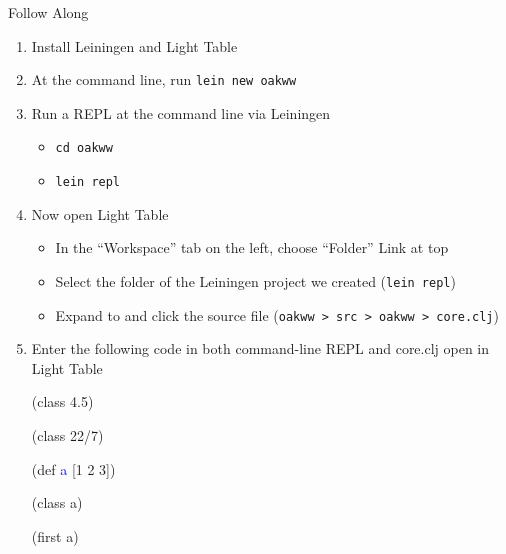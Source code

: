 \documentclass{beamer}
\begin{document}
\begin{frame}[allowframebreaks]{Follow Along}
  \begin{enumerate}
  \item Install Leiningen and Light Table
  \item At the command line, run \texttt{lein new oakww}
  \item Run a REPL at the command line via Leiningen
    \begin{itemize}
    \item \texttt{cd oakww}
    \item \texttt{lein repl}
    \end{itemize}
  \item Now open Light Table
    \begin{itemize}
    \item In the ``Workspace'' tab on the left, choose ``Folder'' Link
      at top
    \item Select the folder of the Leiningen project we created
      (\texttt{lein repl})
    \item Expand to and click the source file (\texttt{oakww > src > oakww > core.clj})
    \end{itemize}

  \framebreak
  \item Enter the following code in both command-line REPL and
    core.clj open in Light Table\\
\begin{small}
{\ttfamily\color{black}
%
\textcolor[rgb]{0.54901963,0.54901963,0.54901963}{(}\textcolor[rgb]{0.28235295,0.23921569,0.54509807}{class}
4.5\textcolor[rgb]{0.54901963,0.54901963,0.54901963}{)}}

{\ttfamily\color{black}
\textcolor[rgb]{0.54901963,0.54901963,0.54901963}{(}\textcolor[rgb]{0.28235295,0.23921569,0.54509807}{class}
22/7\textcolor[rgb]{0.54901963,0.54901963,0.54901963}{)}}

{\ttfamily\color{black}
\textcolor[rgb]{0.54901963,0.54901963,0.54901963}{(}\textcolor[rgb]{0.49803922,0.0,0.49803922}{def}
\textcolor{blue}{a} [1 2
3]\textcolor[rgb]{0.54901963,0.54901963,0.54901963}{)}}

{\ttfamily\color{black}
\textcolor[rgb]{0.54901963,0.54901963,0.54901963}{(}\textcolor[rgb]{0.28235295,0.23921569,0.54509807}{class}
a\textcolor[rgb]{0.54901963,0.54901963,0.54901963}{)}}

{\ttfamily\color{black}
\textcolor[rgb]{0.54901963,0.54901963,0.54901963}{(}\textcolor[rgb]{0.28235295,0.23921569,0.54509807}{first}
a\textcolor[rgb]{0.54901963,0.54901963,0.54901963}{)}}


\end{small}
\end{enumerate}
\end{frame}
\end{document}
